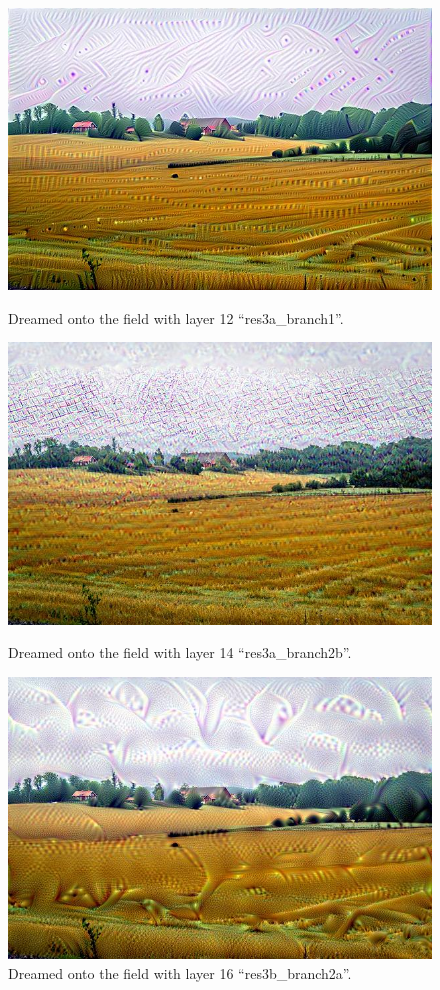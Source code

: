\begin{figure}[H]
	\centering
	\includegraphics[width=1\linewidth]{img/alpsted-landscape_res3a_branch1.jpg}
	\caption{Dreamed onto the field with layer 12 \enquote{res3a\_branch1}.}
	\label{fig:layer-artistic}
	\endminipage\hfill
	\centering
	\includegraphics[width=1\linewidth]{img/14_alpsted-landscape_res3a_branch2b.jpg}
	\caption{Dreamed onto the field with layer 14 \enquote{res3a\_branch2b}.}
	\label{fig:14-landscape}
	\endminipage\hfill
	\centering
	\includegraphics[width=1\linewidth]{img/16_alpsted-landscape_res3b_branch2a.jpg}
	\caption{Dreamed onto the field with layer 16 \enquote{res3b\_branch2a}.}
	\label{fig:16-landscape}
	\endminipage\hfill
\end{figure}


